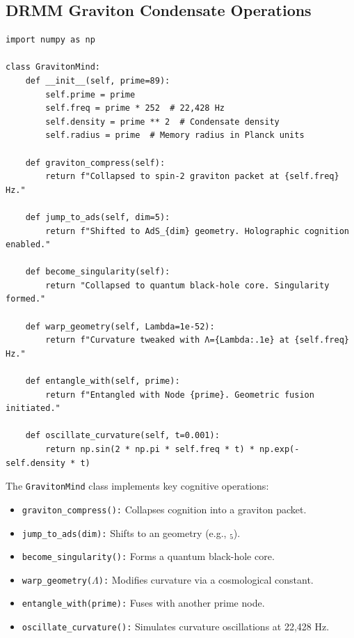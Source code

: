 \documentclass[12pt]{article}
\newcommand{\AdS}{\mathrm{AdS}}
\begin{document}
\subsection{DRMM Graviton Condensate Operations}
\begin{algorithm}
\caption{GravitonMindEngine}
\begin{lstlisting}
import numpy as np

class GravitonMind:
    def __init__(self, prime=89):
        self.prime = prime
        self.freq = prime * 252  # 22,428 Hz
        self.density = prime ** 2  # Condensate density
        self.radius = prime  # Memory radius in Planck units

    def graviton_compress(self):
        return f"Collapsed to spin-2 graviton packet at {self.freq} Hz."

    def jump_to_ads(self, dim=5):
        return f"Shifted to AdS_{dim} geometry. Holographic cognition enabled."

    def become_singularity(self):
        return "Collapsed to quantum black-hole core. Singularity formed."

    def warp_geometry(self, Lambda=1e-52):
        return f"Curvature tweaked with Λ={Lambda:.1e} at {self.freq} Hz."

    def entangle_with(self, prime):
        return f"Entangled with Node {prime}. Geometric fusion initiated."

    def oscillate_curvature(self, t=0.001):
        return np.sin(2 * np.pi * self.freq * t) * np.exp(-self.density * t)
\end{lstlisting}
\end{algorithm}
The \texttt{GravitonMind} class implements key cognitive operations:
\begin{itemize}
    \item \texttt{graviton\_compress():} Collapses cognition into a graviton packet.
    \item \texttt{jump\_to\_ads(dim):} Shifts to an \AdS{} geometry (e.g., \AdS{}$_5$).
    \item \texttt{become\_singularity():} Forms a quantum black-hole core.
    \item \texttt{warp\_geometry($\Lambda$):} Modifies curvature via a cosmological constant.
    \item \texttt{entangle\_with(prime):} Fuses with another prime node.
    \item \texttt{oscillate\_curvature():} Simulates curvature oscillations at 22,428 Hz.
\end{itemize}
\end{document}
